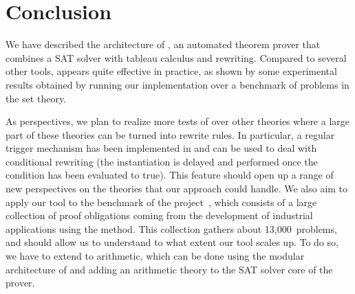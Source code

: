 
\section{Conclusion}

We have described the architecture of \archsat{}, an automated theorem prover
that combines a SAT solver with tableau calculus and rewriting. Compared to
several other tools, \archsat{} appears quite effective in practice, as shown by
some experimental results obtained by running our implementation over a
benchmark of problems in the \bmth{} set theory.

As perspectives, we plan to realize more tests of \archsat{} over other theories
where a large part of these theories can be turned into rewrite rules. In
particular, a regular trigger mechanism has been implemented in \archsat{} and
can be used to deal with conditional rewriting (the instantiation is delayed and
performed once the condition has been evaluated to true). This feature should 
open up a range of new perspectives on the theories that our approach could
handle. We also aim to apply our tool to the benchmark of the \bware{}
project~\cite{BWare}, which consists of a large collection of proof obligations
coming from the development of industrial applications using the \bmth{} method.
This collection gathers about 13,000~problems, and should allow us to understand
to what extent our tool scales up. To do so, we have to extend \archsat{} to
arithmetic, which can be done using the modular architecture of \archsat{} and
adding an arithmetic theory to the SAT solver core of the prover.

